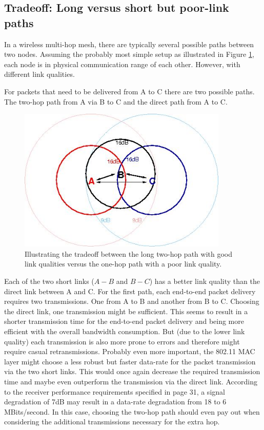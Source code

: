 \documentclass[11pt]{article}
\begin{document}
\subsection{Tradeoff: Long versus short but poor-link paths}

In a wireless multi-hop mesh, there are typically several possible paths between two nodes.
Assuming the probably most simple setup as illustrated in Figure \ref{fig:longVsPoorHops},
each node is in physical communication range of each other. However, with different link qualities.

For packets that need to be delivered from A to C there are two possible paths. The two-hop path from A via B to C and the direct path from A to C.

\begin{figure}[htbp]
  \begin{center}
    \includegraphics[width=10cm]{longVsPoorHops-x01.jpg}
    \caption{Illustrating the tradeoff between the long two-hop path with good link qualities versus the one-hop path with a poor link quality.}
    \label{fig:longVsPoorHops}
  \end{center}
\end{figure}


Each of the two short links ($A-B$ and $B-C$) has a better link quality than the direct link between A and C. For the first path, each end-to-end packet delivery requires two transmissions. One from A to B and another from B to C.
%
Choosing the direct link, one transmission might be sufficient. This seems to result in a shorter transmission time for the end-to-end packet delivery and being more efficient with the overall bandwidth consumption. But (due to the lower link quality) each transmission is also more prone to errors and therefore might require casual retransmissions.
%
Probably even more important, the 802.11 MAC layer might choose a less robust but faster data-rate for the packet transmission via the two short links. This would once again decrease the required transmission time and maybe even outperform the transmission via the direct link.
%
According to the receiver performance requirements specified in \cite{ieee80211a} page 31, a signal degradation of 7dB  may result in a data-rate degradation from 18 to 6 MBits/second. In this case, choosing the two-hop path should even pay out when considering the additional transmissions necessary for the extra hop.
\end{document}
